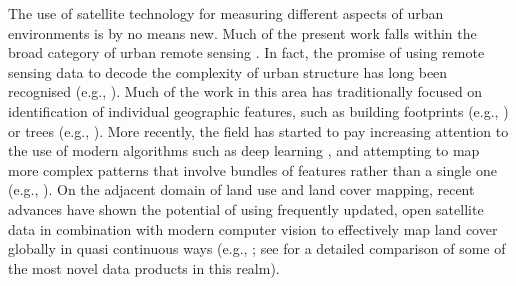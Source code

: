 \documentclass[]{interact}
\theoremstyle{plain}%
\theoremstyle{definition}
\theoremstyle{remark}
\begin{document}
The use of satellite technology for measuring different aspects of urban
environments is by no means new.
Much of the present work falls within the
broad category of urban remote sensing \citep{rashed2010remote, weng2018urban,
yang2021urban}. In fact, the promise of using remote sensing data to decode
the complexity of urban structure has long been recognised (e.g.,
\citealp{longley2002geographical}).
Much of the work in this area has traditionally focused on identification of
individual geographic features, such as building footprints (e.g.,
\citealp{microsoft2019}) or trees (e.g., \citealp{ke2011review}). More
recently, the field has started to pay increasing attention to the use of
modern algorithms such as deep learning \citep{lai2021deep}, and attempting to
map more complex patterns that involve bundles of features rather than a single
one (e.g., \citealp{kuffer2021mapping}).
On the adjacent domain of land use and land cover mapping, recent advances
have shown the potential of using frequently updated, open satellite data in
combination with modern computer vision to effectively map land cover globally
in quasi continuous ways
(e.g., \citealp{karra2021global, brown2022dynamic}; see \citealp{venter2022global} for a
detailed comparison of some of the most novel data products in this realm).
\end{document}
